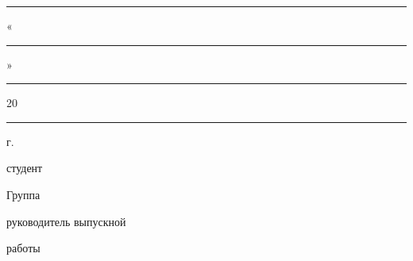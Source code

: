 \documentclass[../thesis.tex]{subfiles}
\begin{document}
\thispagestyle{empty}

\begin{center}

    \noindent\titlesmallboldcaps{\ministry}
    
    \noindent\titlesmallboldcaps{\universityone}\linebreak
    \noindent\titlesmallboldcaps{\universitytwo}\linebreak
    \noindent\titlesmallboldcaps{\universitythree}

\bigskip

    \noindent\titlebig{\faculty}
    
    \noindent\titlebig{\department}

\bigskip

    \null\hfill
    \begin{minipage}{0.5\textwidth}
        
        \begin{flushright}
        \departmentdirector
        
        \rule{3cm}{0.4pt} \departmentdirectorshortname
        
        «\rule{1cm}{0.4pt}» \rule{3cm}{0.4pt} 20\rule{0.5cm}{0.4pt} г.
        \end{flushright}
    \end{minipage}

\bigskip\bigskip\bigskip\bigskip

    \noindent\titlemain{\thesis}

\bigskip

    \noindent\specialization
    
    \noindent\major

\bigskip
    
     \thesisname
    
     студент \myfullname

\bigskip

    \begin{flushleft}
    Группа \groupnum
    \end{flushleft}

\bigskip

    \null\hfill
    \begin{minipage}{0.5\textwidth}
        \begin{center}
             руководитель выпускной
            
             работы
            

\end{center}
\end{minipage}
\end{center}
\end{document}
